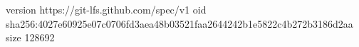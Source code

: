 version https://git-lfs.github.com/spec/v1
oid sha256:4027e60925e07c0706fd3aea48b03521faa2644242b1e5822c4b272b3186d2aa
size 128692
